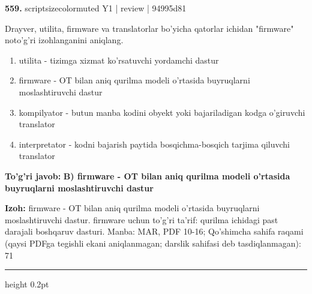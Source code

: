 \documentclass[10pt,a4paper]{article}
\begin{document}
{\bfseries\sffamily\color{ink} 559.} {scriptsizecolor{muted} Y1 | review | 94995d81}
\par
Drayver, utilita, firmware va translatorlar bo'yicha qatorlar ichidan "firmware" noto'g'ri izohlanganini aniqlang.
\begin{enumerate}[label=\Alph*),leftmargin=9mm]
\item utilita - tizimga xizmat ko'rsatuvchi yordamchi dastur
\item firmware - OT bilan aniq qurilma modeli o'rtasida buyruqlarni moslashtiruvchi dastur
\item kompilyator - butun manba kodini obyekt yoki bajariladigan kodga o'giruvchi translator
\item interpretator - kodni bajarish paytida bosqichma-bosqich tarjima qiluvchi translator
\end{enumerate}
\begin{tcolorbox}[enhanced,breakable,colback=teal!4,colframe=teal!60!black,boxrule=0.45pt,arc=1.2mm,left=2.7mm,right=2.7mm,top=1.8mm,bottom=1.8mm,before skip=2mm,after skip=2mm]
{\bfseries\sffamily\color{teal}To'g'ri javob:} \textbf{B) firmware - OT bilan aniq qurilma modeli o'rtasida buyruqlarni moslashtiruvchi dastur}
\par\smallskip
{\bfseries Izoh:} firmware - OT bilan aniq qurilma modeli o'rtasida buyruqlarni moslashtiruvchi dastur. firmware uchun to'g'ri ta'rif: qurilma ichidagi past darajali boshqaruv dasturi. Manba: MAR, PDF 10-16; Qo'shimcha sahifa raqami (qaysi PDFga tegishli ekani aniqlanmagan; darslik sahifasi deb tasdiqlanmagan): 71
\end{tcolorbox}
\vspace{2mm}\hrule height 0.2pt\vspace{3mm}
\end{document}
